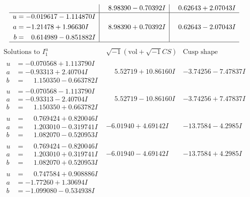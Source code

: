 \documentclass[1p]{elsarticle_modified}
\theoremstyle{definition}
\newcommand{\I}{\sqrt{-1}}
\begin{document}
$$\begin{array}{c|c|c}
 & \phantom{-}8.98390 - 0.70392 I & \phantom{-}0.62643 + 2.07043 I \\ \hline\begin{aligned}
u &= -0.019617 - 1.114870 I \\
a &= -1.21478 + 1.96630 I \\
b &= \phantom{-}0.614989 - 0.851882 I\end{aligned}
 & \phantom{-}8.98390 + 0.70392 I & \phantom{-}0.62643 - 2.07043 I\\
 \hline 
 \end{array}$$\newpage$$\begin{array}{c|c|c}  
\text{Solutions to }I^u_{1}& \I (\text{vol} + \sqrt{-1}CS) & \text{Cusp shape}\\
 \hline 
\begin{aligned}
u &= -0.070568 + 1.113790 I \\
a &= -0.93313 + 2.40704 I \\
b &= \phantom{-}1.150350 - 0.663782 I\end{aligned}
 & \phantom{-}5.52719 + 10.86160 I & -3.74256 - 7.47837 I \\ \hline\begin{aligned}
u &= -0.070568 - 1.113790 I \\
a &= -0.93313 - 2.40704 I \\
b &= \phantom{-}1.150350 + 0.663782 I\end{aligned}
 & \phantom{-}5.52719 - 10.86160 I & -3.74256 + 7.47837 I \\ \hline\begin{aligned}
u &= \phantom{-}0.769424 + 0.820046 I \\
a &= \phantom{-}1.203010 - 0.319741 I \\
b &= \phantom{-}1.082070 - 0.520953 I\end{aligned}
 & -6.01940 + 4.69142 I & -13.7584 - 4.2985 I \\ \hline\begin{aligned}
u &= \phantom{-}0.769424 - 0.820046 I \\
a &= \phantom{-}1.203010 + 0.319741 I \\
b &= \phantom{-}1.082070 + 0.520953 I\end{aligned}
 & -6.01940 - 4.69142 I & -13.7584 + 4.2985 I \\ \hline\begin{aligned}
u &= \phantom{-}0.747584 + 0.908886 I \\
a &= -1.77260 + 1.30694 I \\
b &= -1.099080 - 0.534938 I\end{aligned}

\end{array}$$
\end{document}
